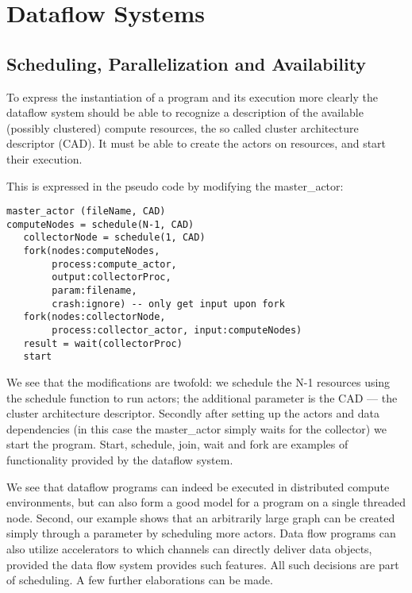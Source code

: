 \documentclass[11pt,a4paper]{article}
\begin{document}
\section{Dataflow Systems}

\subsection{Scheduling, Parallelization and Availability}

To express the instantiation of a program and its execution more
clearly the dataflow system should be able to recognize a description
of the available (possibly clustered) compute resources, the so called
cluster architecture descriptor (CAD).  It must be able to create the
actors on resources, and start their execution.  


\begin{Example}

This is expressed in
the pseudo code by modifying the master\_actor:

\begin{lstlisting}
master_actor (fileName, CAD)
computeNodes = schedule(N-1, CAD)
   collectorNode = schedule(1, CAD)
   fork(nodes:computeNodes, 
        process:compute_actor, 
        output:collectorProc, 
        param:filename, 
        crash:ignore) -- only get input upon fork
   fork(nodes:collectorNode, 
        process:collector_actor, input:computeNodes)
   result = wait(collectorProc)
   start
\end{lstlisting}

We see that the modifications are twofold: we schedule the N-1
resources using the schedule function to run actors; the additional
parameter is the CAD --- the cluster architecture descriptor.
Secondly after setting up the actors and data dependencies (in this
case the master\_actor simply waits for the collector) we start the
program.  Start, schedule, join, wait and fork are examples of
functionality provided by the dataflow system.

\end{Example}

We see that dataflow programs can indeed be executed in distributed
compute environments, but can also form a good model for a program on
a single threaded node.  Second, our example shows that an arbitrarily
large graph can be created simply through a parameter by scheduling
more actors.  Data flow programs can also utilize accelerators to
which channels can directly deliver data objects, provided the data
flow system provides such features.  All such decisions are part of
scheduling.  A few further elaborations can be made.
\end{document}
